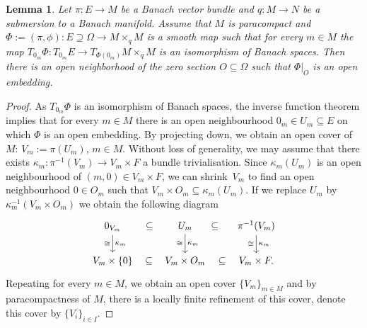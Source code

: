 \documentclass[11pt]{article}
\numberwithin{equation}{section}
\numberwithin{equation}{section}
\newtheorem{Lemma}[Theorem]{Lemma}
\begin{document}
\begin{Lemma}\label{lem:loc2glob_emb}
Let $\pi \colon E\rightarrow M$ be a Banach vector bundle and $q \colon M \rightarrow N$ be a submersion to a Banach manifold. Assume that $M$ is paracompact and $\Phi := (\pi,\phi) \colon E \supseteq \Omega \rightarrow M \times_q M$ is a smooth map such that for every $m\in M$ the map $T_{0_m} \Phi \colon T_{0_m}E \rightarrow T_{\Phi(0_m)}M \times_q M$ is an isomorphism of Banach spaces. Then there is an open neighborhood of the zero section $O\subseteq \Omega$ such that $\Phi|_O$ is an open embedding.
\end{Lemma}
\begin{proof}
As $T_{0_m}\Phi$ is an isomorphism of Banach spaces, the inverse function theorem implies that for every $m \in M$ there is an open neighbourhood $0_m \in U_{m} \subseteq E$ on which $\Phi$ is an open embedding.
By projecting down, we obtain an open cover of $M$:
$V_{m} := \pi(U_{m})$, $m \in M$.
Without loss of generality, we may assume that there exists $\kappa_m \colon \pi^{-1}(V_{m}) \rightarrow V_m \times F$ a bundle trivialisation.
Since $\kappa_{m}(U_{m})$ is an open neighbourhood of $(m,0) \in V_{m} \times F$, we can shrink~$V_{m}$ to find an open neighbourhood $0 \in O_{m}$ such that $V_{m} \times O_{m} \subseteq \kappa_{m}(U_{m})$.
If we replace $U_{m}$ by~$\kappa_{m}^{-1}(V_{m} \times O_{m})$ we obtain the following diagram
\begin{equation*}
 \begin{tikzcd}
 0_{V_{m}} \arrow[r, phantom, sloped, "\subseteq"] \ar[d,"\kappa_{m}", "\cong"'] & U_{m} \arrow[r, phantom, sloped, "\subseteq"] \ar[d,"\kappa_{m}", "\cong"'] & \pi^{-1}(V_{m}) \ar[d,"\kappa_{m}", "\cong"'] \\
 V_{m} \times \{ 0 \} \arrow[r, phantom, sloped, "\subseteq"] & V_{m} \times O_{m} \arrow[r, phantom, sloped, "\subseteq"] & V_{m} \times F.
 \end{tikzcd}
\end{equation*}
Repeating for every $m \in M$, we obtain an open cover $\{ V_{m} \}_{m \in M}$ and by paracompactness of $M$, there is a locally finite refinement of this cover, denote this cover by $\{V_i\}_{i\in I}$.


\end{proof}
\end{document}
